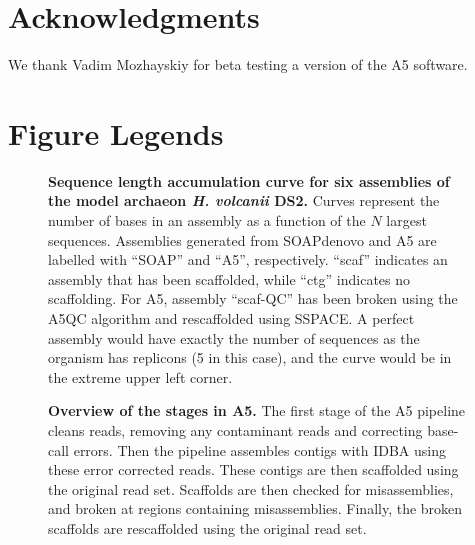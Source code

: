 \documentclass[10pt]{article}
\begin{document}
\section*{Acknowledgments}
We thank Vadim Mozhayskiy for beta testing a version of the A5 software.



\clearpage

\section*{Figure Legends}
\begin{figure}[hp]
\caption{\textbf{Sequence length accumulation curve for six assemblies of the model archaeon \textit{H. volcanii} DS2.} Curves represent the number of bases 
in an assembly as a function of the $N$ largest sequences. Assemblies generated from SOAPdenovo and A5 are labelled with ``SOAP'' and ``A5'', 
respectively. ``scaf'' indicates an assembly that has been scaffolded, while ``ctg'' indicates 
no scaffolding. For A5, assembly ``scaf-QC'' has been broken using the A5QC algorithm and rescaffolded using SSPACE.
A perfect assembly would have exactly the number of sequences as the organism has replicons (5 in this case), and the curve would be
in the extreme upper left corner.}
\label{fig:01}
\end{figure}

\begin{figure}[hp]
\begin{center}
\end{center}
\caption{\textbf{Overview of the stages in A5.} The first stage of the A5 pipeline cleans reads, removing any contaminant
reads and correcting base-call errors. Then the pipeline assembles contigs with IDBA using these error corrected reads. These
contigs are then scaffolded using the original read set. Scaffolds are then checked for misassemblies, and broken at regions
containing misassemblies. Finally, the broken scaffolds are rescaffolded using the original read set.}
\label{fig:02}
\end{figure}
\end{document}

